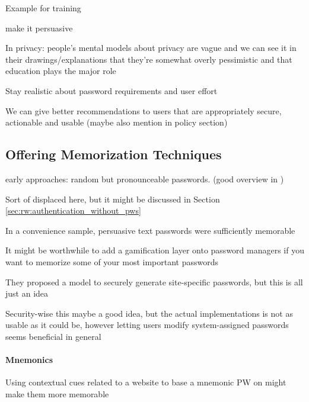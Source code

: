 	Example for training \cite{Bonneau2014ReliableStorage56Bits}
	
	make it persuasive \cite{Zakaria2013DesigningEffectiveSecurityMessages}
	
	In privacy: people's mental models about privacy are vague and we can see it in their drawings/explanations that they're somewhat overly pessimistic and that education plays the major role \cite{Kang2015MentalModelsDrawing}
	
	
	Stay realistic about password requirements and user effort \cite{Florencio2016CommACM}
	
	We can give better recommendations to users that are appropriately secure, actionable and usable \cite{ZhangKennedy2016RevisitingPasswordRules} (maybe also mention in policy section)
		
	
	\subsection{Offering Memorization Techniques}
	
	
	early approaches: random but pronounceable passwords. (good overview in \cite{Kuo2006HumanSelectionMnemonic})
	
	\cite{Bonneau2014ReliableStorage56Bits}
	\cite{Forget2007HelpingUsers}
	Sort of displaced here, but it might be discussed in Section \ref{sec:rw:authentication_without_pws} \cite{Forget2015CYOA}
	\cite{Brown2004GeneratingPWs}
	
	In a convenience sample, persuasive text passwords were sufficiently memorable \cite{Forget2008MemorabilityPersuasivePasswords}
	
	It might be worthwhile to add a gamification layer onto password managers if you want to memorize some of your most important passwords \cite{Kroeze2012GamifyingAuthentication}
	
	They proposed a model to securely generate site-specific passwords, but this is all just an idea \cite{Maqbali2016PasswordGenerators}
	
	
	Security-wise this maybe a good idea, but the actual implementations is not as usable as it could be, however letting users modify system-assigned passwords seems beneficial in general \cite{Huha2015UserReplaceablePasswords}
	
	\paragraph{Mnemonics}
	Using contextual cues related to a website to base a mnemonic PW on might make them more memorable \cite{Mcevoy2016ContextualizingMnemonicPhrase}
	

